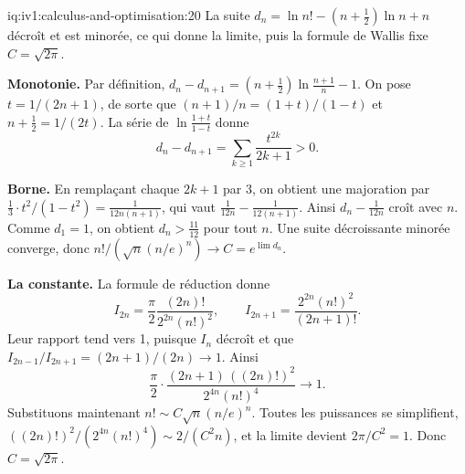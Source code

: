 \begin{solution}{iq:iv1:calculus-and-optimisation:20}
La suite $d_n = \ln n! - (n + \frac12)\ln n + n$ décroît et est minorée, ce qui donne la limite, puis la formule de Wallis fixe $C = \sqrt{2\pi}$.

\textbf{Monotonie.} Par définition, $d_n - d_{n + 1} = (n + \frac12)\ln\frac{n + 1}{n} - 1$. On pose $t = 1/(2n + 1)$, de sorte que $(n + 1)/n = (1 + t)/(1 - t)$ et $n + \frac12 = 1/(2t)$. La série de $\ln\frac{1 + t}{1 - t}$ donne
\[
d_n - d_{n + 1} = \sum_{k \ge 1}\frac{t^{2k}}{2k + 1} > 0.
\]

\textbf{Borne.} En remplaçant chaque $2k + 1$ par 3, on obtient une majoration par $\frac13\cdot t^2/(1 - t^2) = \frac{1}{12n(n + 1)}$, qui vaut $\frac{1}{12n} - \frac{1}{12(n + 1)}$. Ainsi $d_n - \frac{1}{12n}$ croît avec $n$. Comme $d_1 = 1$, on obtient $d_n > \frac{11}{12}$ pour tout $n$. Une suite décroissante minorée converge, donc $n!/(\sqrt{n}(n/e)^n) \to C = e^{\lim d_n}$.

\textbf{La constante.} La formule de réduction donne
\[
I_{2n} = \frac{\pi}{2}\frac{(2n)!}{2^{2n}(n!)^2}, \qquad I_{2n + 1} = \frac{2^{2n}(n!)^2}{(2n + 1)!}.
\]
Leur rapport tend vers 1, puisque $I_n$ décroît et que $I_{2n - 1}/I_{2n + 1} = (2n + 1)/(2n) \to 1$. Ainsi
\[
\frac{\pi}{2}\cdot\frac{(2n + 1)\,((2n)!)^2}{2^{4n}(n!)^4} \to 1.
\]
Substituons maintenant $n! \sim C\sqrt{n}(n/e)^n$. Toutes les puissances se simplifient, $((2n)!)^2/(2^{4n}(n!)^4) \sim 2/(C^2n)$, et la limite devient $2\pi/C^2 = 1$. Donc $C = \sqrt{2\pi}$.



\end{solution}
